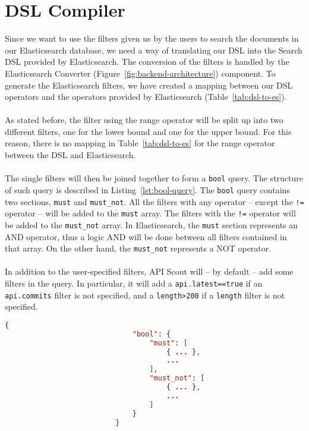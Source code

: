 \section{DSL Compiler}\label{sec:dsl-compiler}
Since we want to use the filters given us by the users to search the documents in our Elasticsearch database, we need a way of translating our DSL into the Search DSL provided by Elasticsearch.
The conversion of the filters is handled by the Elasticsearch Converter (Figure~\ref{fig:backend-architecture}) component.
To generate the Elasticsearch filters, we have created a mapping between our DSL operators and the operators provided by Elasticsearch (Table~\ref{tab:dsl-to-es}). \\ \\
As stated before, the filter using the range operator will be split up into two different filters, one for the lower bound and one for the upper bound.
For this reason, there is no mapping in Table~\ref{tab:dsl-to-es} for the range operator between the DSL and Elasticsearch. \\ \\
The single filters will then be joined together to form a \verb|bool| query.
The structure of such query is described in Listing~\ref{lst:bool-query}.
The \verb|bool| query contains two sections, \verb|must| and \verb|must_not|.
All the filters with any operator -- except the \verb|!=| operator -- will be added to the \verb|must| array.
The filters with the \verb|!=| operator will be added to the \verb|must_not| array.
In Elasticsearch, the \verb|must| section represents an AND operator, thus a logic AND will be done between all filters contained in that array.
On the other hand, the \verb|must_not| represents a NOT operator. \\ \\
In addition to the user-specified filters, API Scout will -- by default -- add some filters in the query.
In particular, it will add a \verb|api.latest==true| if an \verb|api.commits| filter is not specified, and a \verb|length>200| if a \verb|length| filter is not specified.

\begin{center}
    \begin{lstlisting}[label={lst:bool-query},caption={Structure of an Elasticsearch bool query},captionpos=b,language=json]
                          {
                              "bool": {
                                  "must": [
                                      { ... },
                                      ...
                                  ],
                                  "must_not": [
                                      { ... },
                                      ...
                                  ]
                              }
                          }
    \end{lstlisting}
\end{center}

